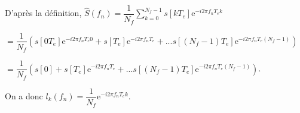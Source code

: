 \ifprof
\begin{corrige}
D'après la définition, 
$\hat{S}\left( f_n\right)= \dfrac{1}{N_f} \sum \limits_{k=0}^{N_f-1} s\left[kT_e\right] \text{e}^{-i 2 \pi f_nT_e k}$

$= \dfrac{1}{N_f} \left(
 s\left[0 T_e\right] \text{e}^{-i 2 \pi f_nT_e 0} + 
 s\left[T_e\right] \text{e}^{-i 2 \pi f_nT_e } + ... 
 s\left[\left( N_f-1\right)T_e\right] \text{e}^{-i 2 \pi f_nT_e \left( N_f-1\right)}\right)$

$= \dfrac{1}{N_f} \left(
 s\left[0\right] + 
 s\left[T_e\right] \text{e}^{-i 2 \pi f_nT_e } + ... 
 s\left[\left( N_f-1\right)T_e\right] \text{e}^{-i 2 \pi f_nT_e \left( N_f-1\right)}\right)$.
 
 On a donc $l_k\left(f_n\right)=\dfrac{1}{N_f}\text{e}^{-i 2 \pi f_nT_e k}$.
\end{corrige}
\else
\fi

